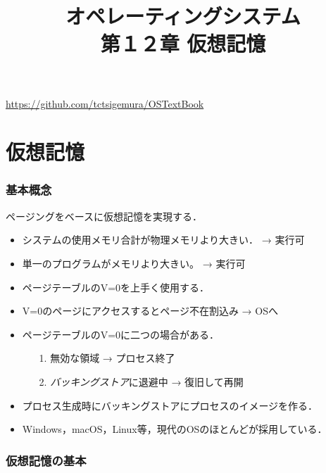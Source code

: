 \documentclass[handout]{beamer}                   %
\begin{document}
\title[仮想記憶]{オペレーティングシステム\\第１２章 仮想記憶}
\date{}
\begin{frame}
  \titlepage
  \centerline{\url{https://github.com/tctsigemura/OSTextBook}}
\end{frame}


\section{仮想記憶}
\begin{frame}
  \frametitle{基本概念}
  ページングをベースに仮想記憶を実現する．
  \begin{itemize}
  \item システムの使用メモリ合計が物理メモリより大きい． → 実行可
  \item 単一のプログラムがメモリより大きい。 → 実行可
  \item ページテーブルのV=0を上手く使用する．
  \item V=0のページにアクセスするとページ不在割込み → OSへ
  \item ページテーブルのV=0に二つの場合がある．
    \begin{itemize}
      \item[1.] 無効な領域 → プロセス終了
      \item[2.] \emph{バッキングストア}に退避中 → 復旧して再開
    \end{itemize}
  \item プロセス生成時にバッキングストアにプロセスのイメージを作る．
  \item Windows，macOS，Linux等，現代のOSのほとんどが採用している．
  \end{itemize}
\end{frame}

\begin{frame}
  \frametitle{仮想記憶の基本}
\end{frame}
\end{document}
